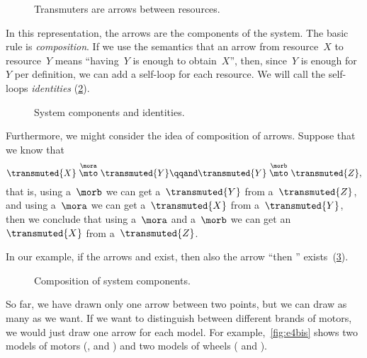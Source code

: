 
\begin{figure}[h!]
    \centering
    \caption{Transmuters are arrows between resources.}
    \label{fig:e2}
\end{figure}

In this representation, the arrows are the components of the system.
The basic rule is \emph{composition}.
If we use the semantics that an arrow from resource~$X$ to resource~$Y$ means ``having~$Y$ is enough to obtain~$X$'', then, since~$Y$ is enough for~$Y$ per definition, we can add a self-loop for each resource.
We will call the self-loops \emph{identities} (\cref{fig:e3}).

\begin{figure}[h!]
    \centering
    \caption{System components and identities. }
    \label{fig:e3}
\end{figure}

Furthermore, we might consider the idea of composition of arrows.
Suppose that we know that
%
\begin{equation}
    \transmuted{X} \stackrel{\mora}{\mto} \transmuted{Y}
    \qqand
    \transmuted{Y} \stackrel{\morb}{\mto} \transmuted{Z},
\end{equation}
%
that is, using a~$\morb$ we can get a~$\transmuted{Y}$ from a~$\transmuted{Z}$, and using a~$\mora$ we can get a~$\transmuted{X}$ from a~$\transmuted{Y}$, then we conclude that using a~$\mora$ and a~$\morb$ we can get an~$\transmuted{X}$ from a~$\transmuted{Z}$.

In our example, if the arrows \wheels  and \motor exist, then also the arrow ``\wheels then \motor'' exists~(\cref{fig:e4}).

\begin{figure}[h!]
    \centering
    \caption{Composition of system components. }
    \label{fig:e4}
\end{figure}

So far, we have drawn only one arrow between two points, but we can draw as many as we want.
If we want to distinguish between different brands of motors, we would just draw one arrow for each model.
For example,~\cref{fig:e4bis} shows two models of motors (, and ) and two models of wheels ( and ).

